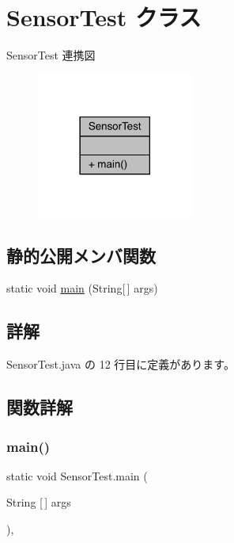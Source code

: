 \hypertarget{class_sensor_test}{}\section{Sensor\+Test クラス}
\label{class_sensor_test}


Sensor\+Test 連携図
\nopagebreak
\begin{figure}[H]
\begin{center}
\leavevmode
\includegraphics[width=146pt]{d9/dfa/class_sensor_test__coll__graph}
\end{center}
\end{figure}
\subsection*{静的公開メンバ関数}
\begin{DoxyCompactItemize}
\item 
static void \mbox{\hyperlink{class_sensor_test_a81c6db5da71c1f91cf56f971b39d98b1}{main}} (String\mbox{[}$\,$\mbox{]} args)
\end{DoxyCompactItemize}


\subsection{詳解}


 Sensor\+Test.\+java の 12 行目に定義があります。



\subsection{関数詳解}
\mbox{\label{class_sensor_test_a81c6db5da71c1f91cf56f971b39d98b1}} 
\subsubsection{\texorpdfstring{main()}{main()}}
{\footnotesize\ttfamily static void Sensor\+Test.\+main (\begin{DoxyParamCaption}\item[{String \mbox{[}$\,$\mbox{]}}]{args }\end{DoxyParamCaption})\hspace{0.3cm}{\ttfamily [inline]}, {\ttfamily [static]}}



